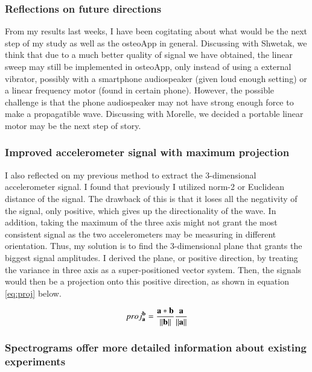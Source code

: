 \documentclass{sigchi}
\begin{document}
\subsubsection{Reflections on future directions} 

From my results last weeks, I have been cogitating about what would be the next step of my study as well as the osteoApp in general. Discussing with Shwetak, we think that due to a much better quality of signal we have obtained, the linear sweep may still be implemented in osteoApp, only instead of using a external vibrator, possibly with a smartphone audiospeaker (given loud enough setting) or a linear frequency motor (found in certain phone). However, the possible challenge is that the phone audiospeaker may not have strong enough force to make a propagatible wave. Discussing with Morelle, we decided a portable linear motor may be the next step of story.

\subsubsection{Improved accelerometer signal with maximum projection} 

I also reflected on my previous method to extract the 3-dimensional accelerometer signal. I found that previously I utilized norm-2 or Euclidean distance of the signal. The drawback of this is that it loses all the negativity of the signal, only positive, which gives up the directionality of the wave. In addition, taking the maximum of the three axis might not grant the most consistent signal as the two accelerometers may be measuring in different orientation. Thus, my solution is to find the 3-dimensional plane that grants the biggest signal amplitudes. I derived the plane, or positive direction, by treating the variance in three axis as a super-positioned vector system. Then, the signals would then be a projection onto this positive direction, as shown in equation \eqref{eq:proj} below.

\begin{equation} \label{eq:proj}
proj_{\bf a}^{\bf b}=\frac{\bf a *\bf b}{\|\bf b\|}\frac{\bf a}{\|\bf a\|}
\end{equation}

\subsubsection{Spectrograms offer more detailed information about existing experiments} 
\end{document}
